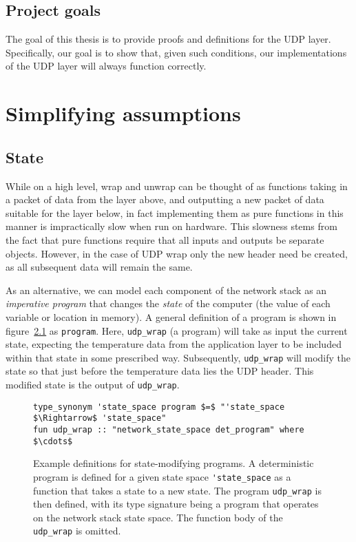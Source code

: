 \documentclass[twoside]{memoir}
\begin{document}
\section{Project goals}
The goal of this thesis is to provide proofs and definitions for the UDP layer. Specifically, our goal is to show that, given such conditions, our implementations of the UDP layer will always function correctly.

\chapter{Simplifying assumptions}
\section{State}
While on a high level, wrap and unwrap can be thought of as
functions taking in a packet of data from the layer above, and outputting a 
new packet of data suitable for the layer below,
in fact implementing them as pure functions in this manner
is impractically slow when run on hardware.
This slowness stems from the fact that pure functions require that all inputs and outputs be
separate objects.
However, in the case of UDP wrap only the new header need be created,
as all subsequent data will remain the same.

As an alternative, we can model each component of the network stack
as an \textit{imperative program} that changes the \textit{state} of the computer
(the value of each variable or location in memory). 
A general definition of a program is shown in figure~\ref{fig:prog-def-det-nondet} as \lstinline{program}.
Here, \lstinline{udp_wrap} (a program) will take as input the current state,
expecting the temperature data from the application layer to be included
within that state in some prescribed way.
Subsequently, \lstinline{udp_wrap} will modify the state so that just before the
temperature data lies the UDP header.
This modified state is the output of \lstinline{udp_wrap}.

\begin{figure}[htb]
    \centering
\begin{lstlisting}[language=isabelle]
type_synonym 'state_space program $=$ "'state_space $\Rightarrow$ 'state_space"
fun udp_wrap :: "network_state_space det_program" where $\cdots$
\end{lstlisting}
    \caption{Example definitions for state-modifying programs.
    A deterministic program is defined for a
    given state space \lstinline{'state_space}
    as a function that takes a state to a new state.
    The program \lstinline{udp_wrap} is then defined, with its type signature
    being a program that operates on the network stack state space.
    The function body of the \lstinline{udp_wrap} is omitted.
    }
    \label{fig:prog-def-det-nondet}
\end{figure}
\end{document}
